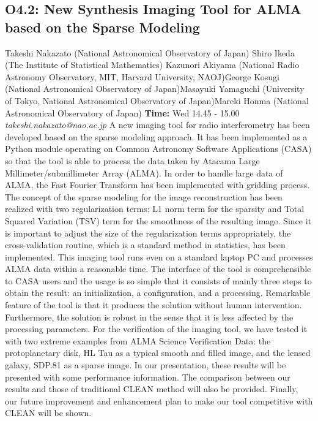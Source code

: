 \documentclass{report}
\begin{document}
\subsection*{O4.2: New Synthesis Imaging Tool for ALMA based on the Sparse Modeling}
\bigskip
Takeshi Nakazato (National Astronomical Observatory of Japan) \newline Shiro Ikeda (The Institute of Statistical Mathematics) \newline  Kazunori Akiyama (National Radio Astronomy Observatory, MIT, Harvard University, NAOJ)\newline  George Kosugi (National Astronomical Observatory of Japan)\newline Masayuki Yamaguchi (University of Tokyo, National Astronomical Observatory of Japan)\newline  Mareki Honma (National Astronomical Observatory of Japan)\newline\newline
{\bf Time:} Wed 14.45 - 15.00\newline
\newline
{\it takeshi.nakazato@nao.ac.jp}\newline
\newline\newline
A new imaging tool for radio interferometry has been developed based on the sparse modeling approach. It has been implemented as a Python module operating on Common Astronomy Software Applications (CASA) so that the tool is able to process the data taken by Atacama Large Millimeter/submillimeter Array (ALMA). In order to handle large data of ALMA, the Fast Fourier Transform has been implemented with gridding process. The concept of the sparse modeling for the image reconstruction has been realized with two regularization terms: L1 norm term for the sparsity and Total Squared Variation (TSV) term for the smoothness of the resulting image. Since it is important to adjust the size of the regularization terms appropriately, the cross-validation routine, which is a standard method in statistics, has been implemented. This imaging tool runs even on a standard laptop PC and processes ALMA data within a reasonable time. The interface of the tool is comprehensible to CASA users and the usage is so simple that it consists of mainly three steps to obtain the result: an initialization, a configuration, and a processing. Remarkable feature of the tool is that it produces the solution without human intervention. Furthermore, the solution is robust in the sense that it is less affected by the processing parameters. For the verification of the imaging tool, we have tested it with two extreme examples from ALMA Science Verification Data: the protoplanetary disk, HL Tau as a typical smooth and filled image, and the lensed galaxy, SDP.81 as a sparse image. In our presentation, these results will be presented with some performance information. The comparison between our results and those of traditional CLEAN method will also be provided. Finally, our future improvement and enhancement plan to make our tool competitive with CLEAN will be shown.\newline
\newpage
\end{document}

